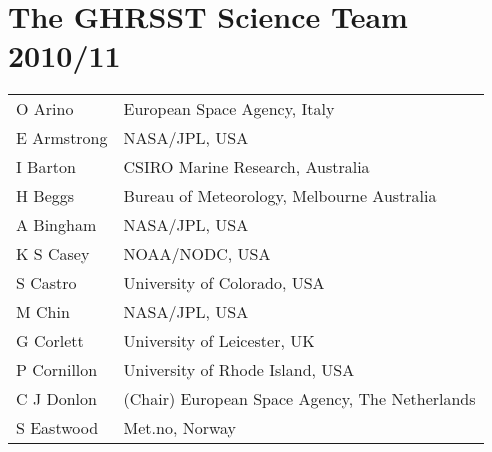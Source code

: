 \pagebreak
\section{The GHRSST Science Team 2010/11}
\begin{tabular}{ l  l }
    O Arino & European Space Agency, Italy\\
    E Armstrong & NASA/JPL, USA\\
    I Barton & CSIRO Marine Research, Australia\\
    H Beggs & Bureau of Meteorology, Melbourne Australia\\
    A Bingham & NASA/JPL, USA\\
    K S Casey & NOAA/NODC, USA\\
    S Castro & University of Colorado, USA\\
    M Chin & NASA/JPL, USA\\
    G Corlett & University of Leicester, UK\\
    P Cornillon & University of Rhode Island, USA\\
    C J Donlon & (Chair) European Space Agency, The Netherlands\\
    S Eastwood &  Met.no, Norway\\
\end{tabular}